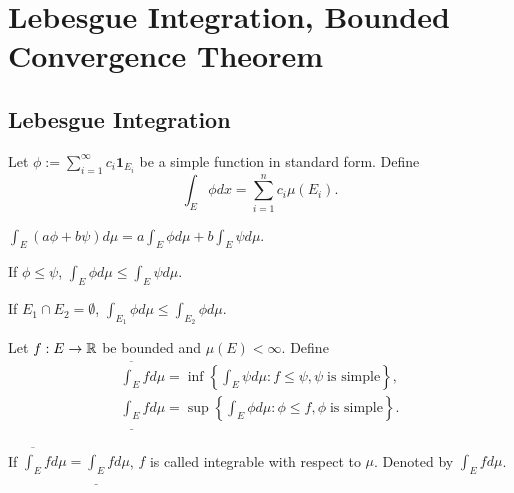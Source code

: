 \documentclass[class=book, crop=false]{standalone}
\begin{document}
    \section{Lebesgue Integration, Bounded Convergence Theorem}
        \subsection{Lebesgue Integration}
        \begin{definition}
            Let $\phi := \sum^{\infty}_{i = 1} c_i \mathbf{1}_{E_i}$ be a simple function in standard form. Define
            \begin{equation*}
                \int_{E} \phi dx = \sum^{n}_{i = 1} c_i \mu(E_i).
            \end{equation*}
        \end{definition}
        
        \begin{theorem}
            $\int_E (a\phi + b\psi) d\mu = a \int_E \phi d\mu + b \int_E \psi d\mu$.
        \end{theorem}
        \begin{theorem}
            If $\phi \leq \psi$, $\int_E \phi d\mu \leq\int_E \psi d\mu$.
        \end{theorem}
        
        \begin{theorem}
            If $E_1 \cap E_2 = \emptyset$, $\int_{E_1} \phi d\mu \leq\int_{E_2} \phi d\mu$.
        \end{theorem}

        \begin{definition}
            Let $f : E \rightarrow \mathbb{R}$ be bounded and $\mu(E) < \infty$. Define
            \begin{align*}
                \overline{\int_E} f d\mu = \inf\left\{\int_E \psi d\mu : f \leq \psi, \psi \;\text{is simple}\right\}, \\
                \underline{\int_E} f d\mu = \sup\left\{\int_E \phi d\mu : \phi \leq f, \phi \;\text{is simple}\right\}.
            \end{align*}
        \end{definition}

        \begin{definition}
            If $\overline{\int_E} f d\mu = \underline{\int_E} f d\mu$, $f$ is called integrable with respect to $\mu$. Denoted by $\int_E f d\mu$.
        \end{definition}
\end{document}
